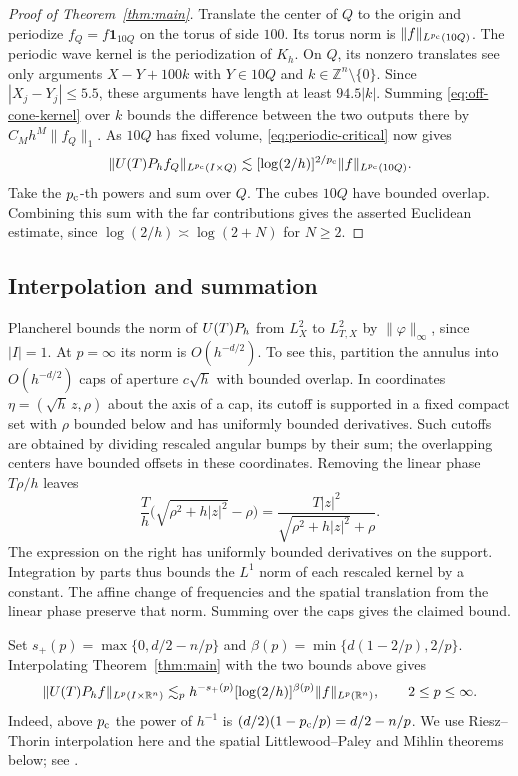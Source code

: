 \begin{proof}[Proof of Theorem~\ref{thm:main}]
Translate the center of $Q$ to the origin and periodize
$f_Q=f\mathbf1_{10Q}$ on the torus of side $100$. Its torus norm is
$\|f\|_{L^{p_{\mathrm c}}(10Q)}$. The periodic wave kernel is the periodization
of $K_h$. On $Q$, its nonzero translates see only arguments
$X-Y+100k$ with $Y\in10Q$ and $k\in\mathbb Z^n\setminus\{0\}$.
Since $|X_j-Y_j|\le5.5$, these arguments have length at least
$94.5|k|$. Summing \eqref{eq:off-cone-kernel} over $k$ bounds the
difference between the two outputs there by $C_M h^M\|f_Q\|_1$.
As $10Q$ has fixed volume, \eqref{eq:periodic-critical} now gives
\[
 \|U(T)P_h f_Q\|_{L^{p_{\mathrm c}}(I\times Q)}
 \lesssim [\log(2/h)]^{2/p_{\mathrm c}}\|f\|_{L^{p_{\mathrm c}}(10Q)} .
\]
Take the $p_{\mathrm c}$-th powers and sum over $Q$. The cubes $10Q$ have
bounded overlap. Combining this sum with the far contributions gives
the asserted Euclidean estimate, since $\log(2/h)\asymp\log(2+N)$
for $N\ge2$.
\end{proof}

\subsection{Interpolation and summation}

Plancherel bounds the norm of $U(T)P_h$ from $L^2_X$ to $L^2_{T,X}$
by $\|\varphi\|_\infty$, since $|I|=1$. At $p=\infty$ its norm is
$O(h^{-d/2})$. To see this, partition the annulus into $O(h^{-d/2})$
caps of aperture $c\sqrt h$ with bounded overlap. In coordinates
$\eta=(\sqrt h\,z,\rho)$ about the axis of a cap, its cutoff is
supported in a fixed compact set with $\rho$ bounded below and has
uniformly bounded derivatives. Such cutoffs are obtained by dividing
rescaled angular bumps by their sum; the overlapping centers have
bounded offsets in these coordinates. Removing the linear phase
$T\rho/h$ leaves
\[
 \frac{T}{h}\bigl(\sqrt{\rho^2+h|z|^2}-\rho\bigr)
 =\frac{T|z|^2}{\sqrt{\rho^2+h|z|^2}+\rho}.
\]
The expression on the right has uniformly bounded derivatives on the
support. Integration by parts thus bounds the $L^1$ norm of each
rescaled kernel by a constant. The affine change of frequencies and
the spatial translation from the linear phase preserve that norm.
Summing over the caps gives the claimed bound.

Set $s_+(p)=\max\{0,d/2-n/p\}$ and
$\beta(p)=\min\{d(1-2/p),2/p\}$. Interpolating
Theorem~\ref{thm:main} with the two bounds above gives
\begin{equation}\label{eq:all-p-frequency}
 \|U(T)P_h f\|_{L^p(I\times\mathbb R^n)}
 \lesssim_p h^{-s_+(p)}[\log(2/h)]^{\beta(p)}\|f\|_{L^p(\mathbb R^n)},
 \qquad 2\le p\le\infty .
\end{equation}
Indeed, above $p_{\mathrm c}$ the power of $h^{-1}$ is
$(d/2)(1-p_{\mathrm c}/p)=d/2-n/p$. We use Riesz--Thorin interpolation here
and the spatial Littlewood--Paley and Mihlin theorems below; see
\cite[Chapters~1 and~6]{Grafakos2014}.

